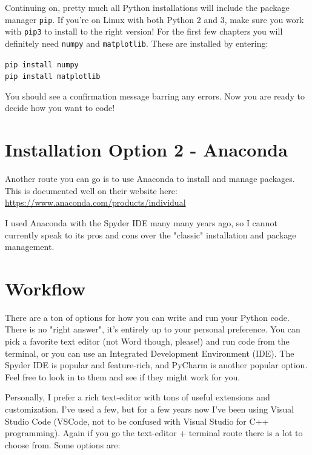 \documentclass[oneside]{book}
\begin{document}
Continuing on, pretty much all Python installations will include the package manager \texttt{pip}. If you're on Linux with both Python 2 and 3, make sure you work with \texttt{pip3} to install to the right version! For the first few chapters you will definitely need \texttt{numpy} and \texttt{matplotlib}. These are installed by entering:

\texttt{pip install numpy}\\
\texttt{pip install matplotlib}

You should see a confirmation message barring any errors. Now you are ready to decide how you want to code!

\section{Installation Option 2 - Anaconda}

Another route you can go is to use Anaconda to install and manage packages. This is documented well on their website here: \url{https://www.anaconda.com/products/individual}

I used Anaconda with the Spyder IDE many many years ago, so I cannot currently speak to its pros and cons over the "classic" installation and package management.

\section{Workflow}

There are a ton of options for how you can write and run your Python code. There is no "right answer", it's entirely up to your personal preference. You can pick a favorite text editor (not Word though, please!) and run code from the terminal, or you can use an Integrated Development Environment (IDE). The Spyder IDE is popular and feature-rich, and PyCharm is another popular option. Feel free to look in to them and see if they might work for you.

Personally, I prefer a rich text-editor with tons of useful extensions and customization. I've used a few, but for a few years now I've been using Visual Studio Code (VSCode, not to be confused with Visual Studio for C++ programming). Again if you go the text-editor + terminal route there is a lot to choose from. Some options are:
\end{document}
